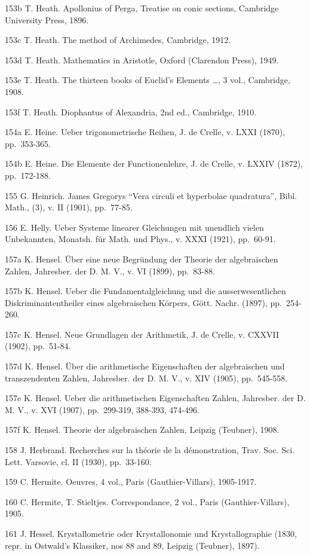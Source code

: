 153b T. Heath. Apollonius of Perga, Treatise on conic sections, Cambridge University Press, 1896.

153c T. Heath. The method of Archimedes, Cambridge, 1912.

153d T. Heath. Mathematics in Aristotle, Oxford (Clarendon Press), 1949.

153e T. Heath. The thirteen books of Euclid's Elements \ldots, 3 vol., Cambridge, 1908.

153f T. Heath. Diophantus of Alexandria, 2nd ed., Cambridge, 1910.

154a E. Heine. Ueber trigonometrische Reihen, J. de Crelle, v. LXXI (1870), pp.~353-365.

154b E. Heine. Die Elemente der Functionenlehre, J. de Crelle, v. LXXIV (1872), pp.~172-188.

155 G. Heinrich. James Gregorys ``Vera circuli et hyperbolae quadratura'', Bibl. Math., (3), v. II (1901), pp.~77-85.

156 E. Helly. Ueber Systeme linearer Gleichungen mit unendlich vielen Unbekannten, Monatsh. für Math. und Phys., v. XXXI (1921), pp.~60-91.

157a K. Hensel. Über eine neue Begründung der Theorie der algebraischen Zahlen, Jahresber. der D. M. V., v. VI (1899), pp.~83-88.

157b K. Hensel. Ueber die Fundamentalgleichung und die ausserwesentlichen Diskriminantentheiler eines algebraischen Körpers, Gött. Nachr. (1897), pp.~254-260.

157c K. Hensel. Neue Grundlagen der Arithmetik, J. de Crelle, v. CXXVII (1902), pp.~51-84.

157d K. Hensel. Über die arithmetische Eigenschaften der algebraischen und transzendenten Zahlen, Jahresber. der D. M. V., v. XIV (1905), pp.~545-558.

157e K. Hensel. Ueber die arithmetischen Eigenschaften Zahlen, Jahresber. der D. M. V., v. XVI (1907), pp.~299-319, 388-393, 474-496.

157f K. Hensel. Theorie der algebraischen Zahlen, Leipzig (Teubner), 1908.

158 J. Herbrand. Recherches sur la théorie de la démonstration, Trav. Soc. Sci. Lett. Varsovie, cl. II (1930), pp.~33-160.

159 C. Hermite. Oeuvres, 4 vol., Paris (Gauthier-Villars), 1905-1917.

160 C. Hermite, T. Stieltjes. Correspondance, 2 vol., Paris (Gauthier-Villars), 1905.

161 J. Hessel. Krystallometrie oder Krystallonomie und Krystallographie (1830, repr. in Ostwald's Klassiker, nos 88 and 89, Leipzig (Teubner), 1897).

